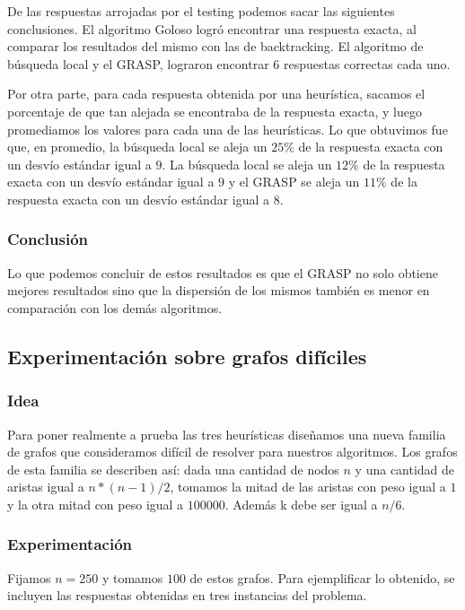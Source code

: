 De las respuestas arrojadas por el testing podemos sacar las siguientes conclusiones. El algoritmo Goloso logró encontrar una respuesta exacta, al comparar los resultados del mismo con las de backtracking. El algoritmo de búsqueda local y el GRASP, lograron encontrar 6 respuestas correctas cada uno.

Por otra parte, para cada respuesta obtenida por una heurística, sacamos el porcentaje de que tan alejada se encontraba de la respuesta exacta, y luego promediamos los valores para cada una de las heurísticas. Lo que obtuvimos fue que, en promedio, la búsqueda local se aleja un $25 \%$ de la respuesta exacta con un desvío estándar igual a $9$. La búsqueda local se aleja un $12 \%$ de la respuesta exacta con un desvío estándar igual a $9$ y el GRASP se aleja un $11 \%$ de la respuesta exacta con un desvío estándar igual a $8$.

\subsubsection{Conclusión}

Lo que podemos concluir de estos resultados es que el GRASP no solo obtiene mejores resultados sino que la dispersión de los mismos también es menor en comparación con los demás algoritmos. 

\subsection{Experimentación sobre grafos difíciles}

\subsubsection{Idea}

Para poner realmente a prueba las tres heurísticas diseñamos una nueva familia de grafos que consideramos difícil de resolver para nuestros algoritmos. Los grafos de esta familia se describen así: dada una cantidad de nodos $n$ y una cantidad de aristas igual a $n*(n-1)/2$, tomamos la mitad de las aristas con peso igual a $1$ y la otra mitad con peso igual a $100000$. Además k debe ser igual a $n/6$.

\subsubsection{Experimentación}

Fijamos $n=250$ y tomamos $100$ de estos grafos. Para ejemplificar lo obtenido, se incluyen las respuestas obtenidas en tres instancias del problema.

